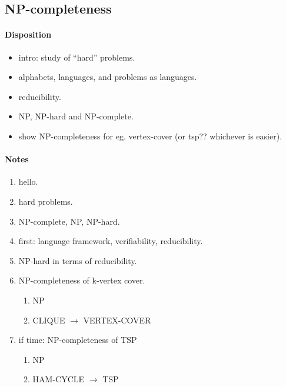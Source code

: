 \newpage

\subsection{NP-completeness}

\paragraph{Disposition}
\begin{itemize}
\item intro: study of ``hard'' problems.
\item alphabets, languages, and problems as languages.
\item reducibility.
\item NP, NP-hard and NP-complete.
\item show NP-completeness for eg. vertex-cover (or tsp?? whichever is easier).
\end{itemize}


\paragraph{Notes}

\begin{enumerate}
  \item hello.
  \item hard problems.
  \item NP-complete, NP, NP-hard.
  \item first: language framework, verifiability, reducibility.
  \item NP-hard in terms of reducibility.\\
  \item NP-completeness of k-vertex cover.
    \begin{enumerate}
      \item NP
      \item CLIQUE $\to$ VERTEX-COVER
    \end{enumerate}
  \item if time: NP-completeness of TSP
    \begin{enumerate}
      \item NP
      \item HAM-CYCLE $\to$ TSP
    \end{enumerate}
\end{enumerate}
